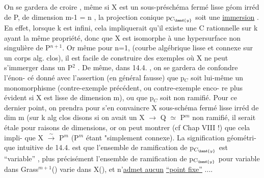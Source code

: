 On se gardera de croire , même si X est un sous-préschéma fermé
lisse géom irréd de P, de dimension m-1 = n ,  la projection conique p$_{C_{\hand{y}}}$
soit  une \uline{immersion} . En effet, lorsque k est infini, cela impliquerait
qu'il existe une C rationnelle sur k ayant la même propriété, donc que X
est isomorphe à une hypersurface non singulière de  P$^{n+1}$. Or
même pour n=1, (courbe algébrique  lisse  et connexe sur un corps alg.
clos), il est facile de construire des exemples où X ne peut s'immerger
dans un P$^2$ . De même, dans 14.4. , on se gardera de confondre l'énon-%
cé donné avec l'assertion (en général fausse) que p$_C$ soit lui-même un
monomorphisme (contre-exemple précédent, ou contre-exemple enco-%
re plus évident si X est lisse de dimension m), ou que p$_C$ soit non
ramifié. Pour ce dernier point, on prendra pour s'en convaincre X
sous-schéma fermé lisse  irréd de dim m (sur k alg clos disons
si  on avait un X $\to$ Q $\simeq$ P$^m$ non ramifié, il serait étale pour
raisons de dimensions, or on peut montrer (cf Chap VIII !) que cela impli-%
que X $\xrightarrow{\sim}$ P$^m$ (P$^m$ étant "simplement connexe). \hand{--} La signification géométri-%
que intuitive de 14.4. est que l'ensemble de
ramification de p$_{C_{\hand{y}}}$ est ``variable'' , plus précisément l'ensemble de
ramification de p$_{C_{\hand{y}}}$ pour  variable dans  Grass$^{m+1}$() varie dans X(), et
n'\uline{admet aucun}  \uline{``point fixe''} ....

